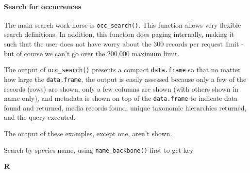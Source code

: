 \documentclass[author-year, review, 11pt]{components/elsarticle} %
\newenvironment{Shaded}{\begin{snugshade}}{\end{snugshade}}
\newcommand{\KeywordTok}[1]{\textcolor[rgb]{0.13,0.29,0.53}{\textbf{#1}}}
\newcommand{\DataTypeTok}[1]{\textcolor[rgb]{0.13,0.29,0.53}{#1}}
\newcommand{\DecValTok}[1]{\textcolor[rgb]{0.00,0.00,0.81}{#1}}
\newcommand{\StringTok}[1]{\textcolor[rgb]{0.31,0.60,0.02}{#1}}
\newcommand{\CommentTok}[1]{\textcolor[rgb]{0.56,0.35,0.01}{\textit{#1}}}
\newcommand{\OperatorTok}[1]{\textcolor[rgb]{0.81,0.36,0.00}{\textbf{#1}}}
\newcommand{\NormalTok}[1]{#1}
\begin{document}
\paragraph{Search for occurrences}\label{search-for-occurrences}

The main search work-horse is \texttt{occ\_search()}. This function
allows very flexible search definitions. In addition, this function does
paging internally, making it such that the user does not have worry
about the 300 records per request limit - but of course we can't go over
the 200,000 maximum limit.

The output of \texttt{occ\_search()} presents a compact
\texttt{data.frame} so that no matter how large the \texttt{data.frame},
the output is easily assessed because only a few of the records (rows)
are shown, only a few columns are shown (with others shown in name
only), and metadata is shown on top of the \texttt{data.frame} to
indicate data found and returned, media records found, unique taxonomic
hierarchies returned, and the query executed.

The output of these examples, except one, aren't shown.

Search by species name, using \texttt{name\_backbone()} first to get key

\textbf{R}

\begin{Shaded}
\end{Shaded}
\end{document}
